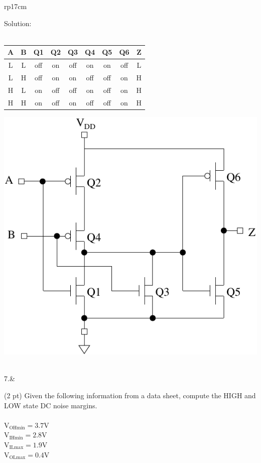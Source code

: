 \documentclass{article}
\begin{document}
\begin{longtable}[l]{rp{17cm}}
\begin{minipage}[t]{\linewidth}
Solution: \\ \\
\begin{tabular}{ccccccccc}
  \textbf{A} & \textbf{B} & \textbf{Q1} & \textbf{Q2} & \textbf{Q3} & \textbf{Q4} & \textbf{Q5} & \textbf{Q6} & \textbf{Z} \\
  \hline
  L & L & off & on & off & on & on & off & L\\
  L & H & off & on & on & off & off & on & H\\
  H & L & on & off & off & on & off & on & H\\
  H & H & on & off & on & off & off & on & H\\
\end{tabular}
\medskip
\includegraphics{../CMOSCircuits/Assessments/CMOSORGate}
\end{minipage}\\
\medskip
7.&\begin{minipage}[t]{\linewidth}(2 pt) Given the following information from a data sheet, compute the HIGH and LOW state DC noise margins.\\ \\
$\textrm{V}_{\textrm{OHmin}} = 3.7 \textrm{V}$\\
$\textrm{V}_{\textrm{IHmin}} = 2.8 \textrm{V}$\\
$\textrm{V}_{\textrm{ILmax}} = 1.9 \textrm{V}$\\
$\textrm{V}_{\textrm{OLmax}} = 0.4 \textrm{V}$\\


\end{minipage}
\end{longtable}
\end{document}

